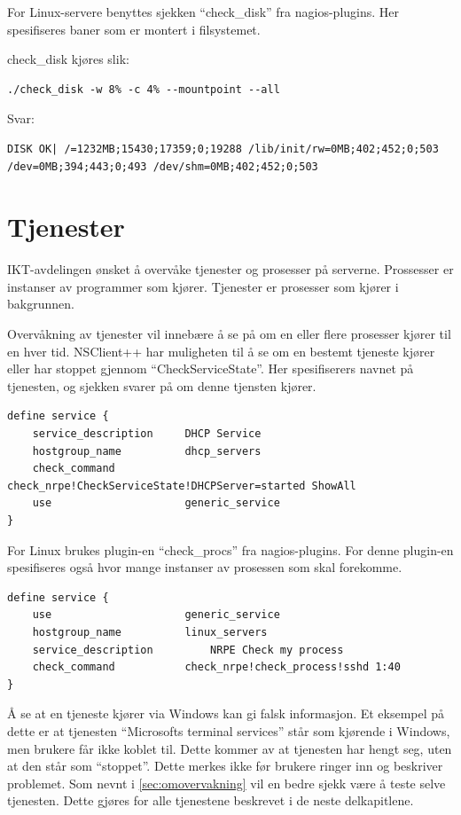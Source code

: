 For Linux-servere benyttes sjekken ``check\_disk'' fra nagios-plugins. Her spesifiseres baner som er montert i filsystemet.

check\_disk kjøres slik:
\begin{lstlisting}[style=example]
./check_disk -w 8% -c 4% --mountpoint --all
\end{lstlisting}
Svar: 
\begin{lstlisting}[style=example]
DISK OK| /=1232MB;15430;17359;0;19288 /lib/init/rw=0MB;402;452;0;503 /dev=0MB;394;443;0;493 /dev/shm=0MB;402;452;0;503
\end{lstlisting}

\section{Tjenester}
IKT-avdelingen ønsket å overvåke tjenester og prosesser på serverne. Prossesser er instanser av programmer som kjører. Tjenester er prosesser som kjører i bakgrunnen. 

Overvåkning av tjenester vil innebære å se på om en eller flere prosesser kjører til en hver tid. NSClient++ har muligheten til å se om en bestemt tjeneste kjører eller har stoppet gjennom ``CheckServiceState''. Her spesifiserers navnet på tjenesten, og sjekken svarer på om denne tjensten kjører.
\begin{lstlisting}[style=example]
define service {
    service_description     DHCP Service
    hostgroup_name          dhcp_servers
    check_command           check_nrpe!CheckServiceState!DHCPServer=started ShowAll
    use                     generic_service
}
\end{lstlisting}
For Linux brukes plugin-en ``check\_procs'' fra nagios-plugins. For denne plugin-en spesifiseres også hvor mange instanser av prosessen som skal forekomme. 
\begin{lstlisting}[style=example]
define service {
    use            	        generic_service
    hostgroup_name       	linux_servers
    service_description     	NRPE Check my process
    check_command        	check_nrpe!check_process!sshd 1:40
}
\end{lstlisting}

Å se at en tjeneste kjører via Windows kan gi falsk informasjon. Et eksempel på dette er  at tjenesten ``Microsofts terminal services'' står som kjørende i Windows, men brukere får ikke koblet til. Dette kommer av at tjenesten har hengt seg, uten at den står som ``stoppet''. Dette merkes ikke før brukere ringer inn og beskriver problemet\cite{serviceproblem}. Som nevnt i \ref{sec:omovervakning} vil en bedre sjekk være å teste selve tjenesten. Dette gjøres for alle tjenestene beskrevet i de neste delkapitlene.

